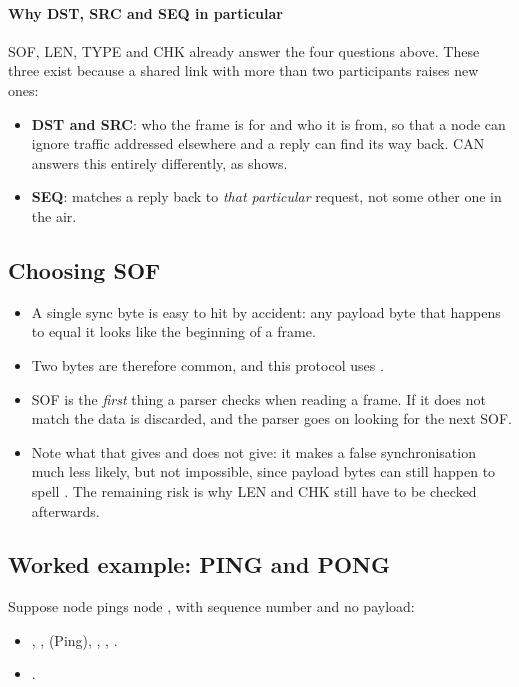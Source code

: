 \paragraph{Why DST, SRC and SEQ in particular}
SOF, LEN, TYPE and CHK already answer the four questions above. These three exist because a shared
link with more than two participants raises new ones:
\begin{itemize}
  \item \textbf{DST and SRC}: who the frame is for and who it is from, so that a node can ignore
    traffic addressed elsewhere and a reply can find its way back. CAN answers this entirely
    differently, as  shows.
  \item \textbf{SEQ}: matches a reply back to \emph{that particular} request, not some other one in
    the air.
\end{itemize}

\subsection*{Choosing SOF}
\begin{itemize}
  \item A single sync byte is easy to hit by accident: any payload byte that happens to equal it
    looks like the beginning of a frame.
  \item Two bytes are therefore common, and this protocol uses .
  \item SOF is the \emph{first} thing a parser checks when reading a frame. If it does not match the
    data is discarded, and the parser goes on looking for the next SOF.
  \item Note what that gives and does not give: it makes a false synchronisation much less likely,
    but not impossible, since payload bytes can still happen to spell . The remaining
    risk is why LEN and CHK still have to be checked afterwards.
\end{itemize}

\subsection*{Worked example: PING and PONG}
Suppose node  pings node , with sequence number  and no payload:
\begin{itemize}
  \item {}, ,  (Ping), ,
    , .
  \item {}.
\end{itemize}

